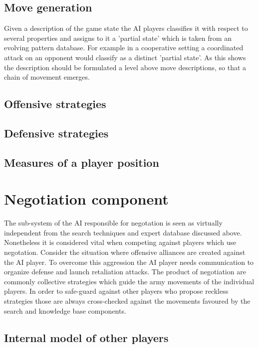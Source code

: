 \documentclass[12pt]{article}
\begin{document}
\subsection{Move generation}

Given a description of the game state the AI players classifies
it with respect to several properties and assigns to it a 'partial state'
which is taken from an evolving pattern database. For example in a cooperative
setting a coordinated attack on an opponent would classify as a distinct
'partial state'. As this shows the description should be formulated a level
above move descriptions, so that a chain of movement emerges.

\subsection{Offensive strategies}

\subsection{Defensive strategies}

\subsection{Measures of a player position}


\section{Negotiation component}

The sub-system of the AI responsible for negotation
is seen as virtually independent from the search techniques
and expert database discussed above. Nonetheless it is 
considered vital when competing against players which
use negotation. Consider the situation where offensive alliances
are created against the AI player. To overcome this aggression 
the AI player needs communication to organize defense and launch
retaliation attacks. The product of negotiation are commonly
collective strategies which guide the army movements of the
individual players. In order to safe-guard against other
players who propose reckless strategies those are always
cross-checked against the movements favoured by the search
and knowledge base components.

\subsection{Internal model of other players}
\end{document}

